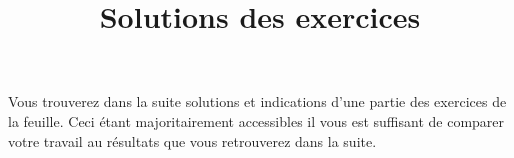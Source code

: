 \documentclass[11pt, a4paper]{article}
\begin{document}
\pretitle{\vspace{-2\baselineskip} \begin{center}}
\title{%
  { \huge Solutions des exercices}%
}
\posttitle{
\end{center}
  \vspace{.5\baselineskip}
  \rule{\textwidth}{1.5pt}
  \vspace{-5\baselineskip}
}

\maketitle\thispagestyle{fancy}

\noindent Vous trouverez dans la suite solutions et indications d'une
partie des exercices de la feuille. Ceci étant majoritairement
accessibles il vous est suffisant de comparer votre travail au
résultats que vous retrouverez dans la suite.
\end{document}
